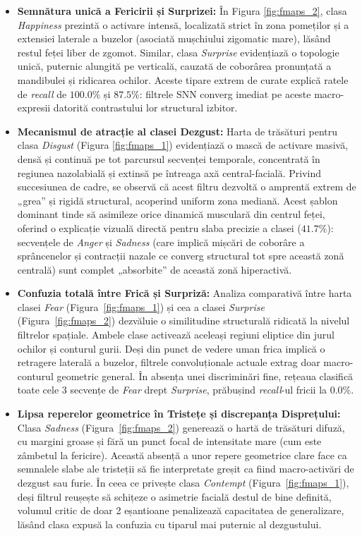 \begin{itemize}
	\item \textbf{Semnătura unică a Fericirii și Surprizei:} În Figura \ref{fig:fmaps_2}, clasa \textit{Happiness} prezintă o activare intensă, localizată strict în zona pomeților și a extensiei laterale a buzelor (asociată mușchiului zigomatic mare), lăsând restul feței liber de zgomot. Similar, clasa \textit{Surprise} evidențiază o topologie unică, puternic alungită pe verticală, cauzată de coborârea pronunțată a mandibulei și ridicarea ochilor. Aceste tipare extrem de curate explică ratele de \textit{recall} de $100.0\%$ și $87.5\%$: filtrele SNN converg imediat pe aceste macro-expresii datorită contrastului lor structural izbitor.
	
	\item \textbf{Mecanismul de atracție al clasei Dezgust:} Harta de trăsături pentru clasa \textit{Disgust} (Figura \ref{fig:fmaps_1}) evidențiază o mască de activare masivă, densă și continuă pe tot parcursul secvenței temporale, concentrată în regiunea nazolabială și extinsă pe întreaga axă central-facială. Privind succesiunea de cadre, se observă că acest filtru dezvoltă o amprentă extrem de „grea” și rigidă structural, acoperind uniform zona mediană. Acest șablon dominant tinde să asimileze orice dinamică musculară din centrul feței, oferind o explicație vizuală directă pentru slaba precizie a clasei ($41.7\%$): secvențele de \textit{Anger} și \textit{Sadness} (care implică mișcări de coborâre a sprâncenelor și contracții nazale ce converg structural tot spre această zonă centrală) sunt complet „absorbite” de această zonă hiperactivă.
	
	\item \textbf{Confuzia totală între Frică și Surpriză:} Analiza comparativă între harta clasei \textit{Fear} (Figura~\ref{fig:fmaps_1}) și cea a clasei \textit{Surprise} (Figura~\ref{fig:fmaps_2}) dezvăluie o similitudine structurală ridicată la nivelul filtrelor spațiale. Ambele clase activează aceleași regiuni eliptice din jurul ochilor și conturul gurii. Deși din punct de vedere uman frica implică o retragere laterală a buzelor, filtrele convoluționale actuale extrag doar macro-conturul geometric general. În absența unei discriminări fine, rețeaua clasifică toate cele 3 secvențe de \textit{Fear} drept \textit{Surprise}, prăbușind \textit{recall}-ul fricii la $0.0\%$.
	
	\item \textbf{Lipsa reperelor geometrice în Tristețe și discrepanța Disprețului:} Clasa \textit{Sadness} (Figura~\ref{fig:fmaps_2}) generează o hartă de trăsături difuză, cu margini groase și fără un punct focal de intensitate mare (cum este zâmbetul la fericire). Această absență a unor repere geometrice clare face ca semnalele slabe ale tristeții să fie interpretate greșit ca fiind macro-activări de dezgust sau furie. În ceea ce privește clasa \textit{Contempt} (Figura~\ref{fig:fmaps_1}), deși filtrul reușește să schițeze o asimetrie facială destul de bine definită, volumul critic de doar 2 eșantioane penalizează capacitatea de generalizare, lăsând clasa expusă la confuzia cu tiparul mai puternic al dezgustului.
	
\end{itemize}

